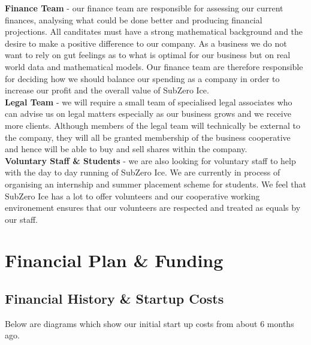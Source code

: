 \documentclass{article}
\begin{document}
  {\bf Finance Team} - our finance team are responsible for assessing our current finances, analysing what could be done better and producing financial projections. All canditates must have a strong mathematical background and the desire to make a positive difference to our company. As a business we do not want to rely on gut feelings as to what is optimal for our business but on real world data and mathematical models. Our finance team are therefore responsible for deciding how we should balance our spending as a company in order to increase our profit and the overall value of SubZero Ice. \\

  {\bf Legal Team} - we will require a small team of specialised legal associates who can advise us on legal matters especially as our business grows and we receive more clients. Although members of the legal team will technically be external to the company, they will all be granted membership of the business cooperative and hence will be able to buy and sell shares within the company. \\

  {\bf Voluntary Staff \& Students} - we are also looking for voluntary staff to help with the day to day running of SubZero Ice. We are currently in process of organising an internship and summer placement scheme for students. We feel that SubZero Ice has a lot to offer volunteers and our cooperative working environement ensures that our volunteers are respected and treated as equals by our staff.


\section{Financial Plan \& Funding}

\subsection{Financial History \& Startup Costs}

Below are diagrams which show our initial start up costs from about 6 months ago. \\
\end{document}
